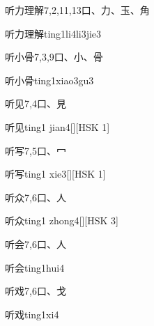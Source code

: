 \begin{entry}{听力理解}{7,2,11,13}{⼝、⼒、⽟、⾓}
  \begin{phonetics}{听力理解}{ting1li4li3jie3}
  \end{phonetics}
\end{entry}

\begin{entry}{听小骨}{7,3,9}{⼝、⼩、⾻}
  \begin{phonetics}{听小骨}{ting1xiao3gu3}
  \end{phonetics}
\end{entry}

\begin{entry}{听见}{7,4}{⼝、⾒}
  \begin{phonetics}{听见}{ting1 jian4}[][HSK 1]
  \end{phonetics}
\end{entry}

\begin{entry}{听写}{7,5}{⼝、⼍}
  \begin{phonetics}{听写}{ting1 xie3}[][HSK 1]
  \end{phonetics}
\end{entry}

\begin{entry}{听众}{7,6}{⼝、⼈}
  \begin{phonetics}{听众}{ting1 zhong4}[][HSK 3]
  \end{phonetics}
\end{entry}

\begin{entry}{听会}{7,6}{⼝、⼈}
  \begin{phonetics}{听会}{ting1hui4}
  \end{phonetics}
\end{entry}

\begin{entry}{听戏}{7,6}{⼝、⼽}
  \begin{phonetics}{听戏}{ting1xi4}
  \end{phonetics}
\end{entry}

